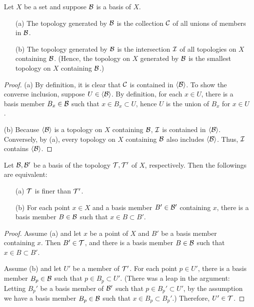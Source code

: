 \begin{obs}
    Let $X$ be a set and suppose ${\mathcal{B}}$ is a basis of $X$.
    \begin{enumerate}
        \item[(a)]
        {
            The topology generated by ${\mathcal{B}}$ is the collection ${\mathcal{C}}$ of all unions of members in ${\mathcal{B}}$.
        }
        \item[(b)]
        {
            The topology generated by ${\mathcal{B}}$ is the intersection ${\mathcal{I}}$ of all topologies on $X$ containing ${\mathcal{B}}$. (Hence, the topology on $X$ generated by ${\mathcal{B}}$ is the smallest topology on $X$ containing ${\mathcal{B}}$.)
        }
    \end{enumerate}
\end{obs}
\begin{proof}
    \hangindent=0.65cm
    (a)
    By definition, it is clear that ${\mathcal{C}}$ is contained in ${\left\langle{{\mathcal{B}}}\right\rangle}$.
    To show the converse inclusion, suppose $U\in{\left\langle{{\mathcal{B}}}\right\rangle}$.
    By definition, for each $x\in U$, there is a basis member $B_x\in{\mathcal{B}}$ such that $x\in B_x\subset U$, hence $U$ is the union of $B_x$ for $x\in U$.

    \noindent(b)
    Because ${\left\langle{{\mathcal{B}}}\right\rangle}$ is a topology on $X$ containing ${\mathcal{B}}$, ${\mathcal{I}}$ is contained in ${\left\langle{{\mathcal{B}}}\right\rangle}$.
    Conversely, by (a), every topology on $X$ containing ${\mathcal{B}}$ also includes ${\left\langle{{\mathcal{B}}}\right\rangle}$.
    Thus, ${\mathcal{I}}$ contains ${\left\langle{{\mathcal{B}}}\right\rangle}$.
\end{proof}

\begin{lem}
    Let ${\mathcal{B}}, {\mathcal{B}}'$ be a basis of the topology ${\mathcal{T}}, {\mathcal{T}}'$ of $X$, respectively.
    Then the followings are equivalent:
    \begin{enumerate}
        \item[(a)]
        {
            ${\mathcal{T}}$ is finer than ${\mathcal{T}}'$.
        }
        \item[(b)]
        {
            For each point $x\in X$ and a basis member $B'\in{\mathcal{B}}'$ containing $x$, there is a basis member $B\in{\mathcal{B}}$ such that $x\in B\subset B'$.
        }
    \end{enumerate}
\end{lem}
\begin{proof}
    Assume (a) and let $x$ be a point of $X$ and $B'$ be a basis member containing $x$.
    Then $B'\in{\mathcal{T}}$, and there is a basis member $B\in{\mathcal{B}}$ such that $x\in B\subset B'$.

    Assume (b) and let $U'$ be a member of ${\mathcal{T}}'$.
    For each point $p\in U'$, there is a basis member $B_p\in{\mathcal{B}}$ such that $p\in B_p\subset U'$.
    (There was a leap in the argument: Letting $B_p'$ be a basis member of ${\mathcal{B}}'$ such that $p\in B_p'\subset U'$, by the assumption we have a basis member $B_p\in{\mathcal{B}}$ such that $x\in B_p\subset B_p'$.)
    Therefore, $U'\in{\mathcal{T}}$.
\end{proof}


